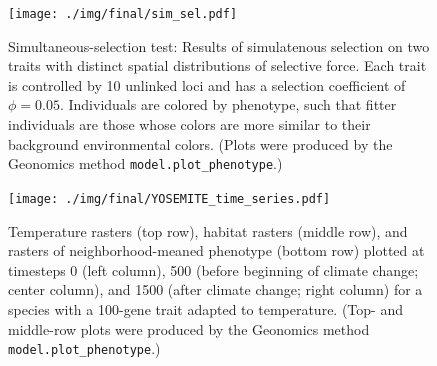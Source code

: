 ﻿\documentclass{article}
\begin{document}
        

\begin{figure}[H]
        \centering
        \texttt{[image: ./img/final/sim\_sel.pdf]}
        \caption{Simultaneous-selection test: Results of simulatenous selection
                 on two traits with distinct spatial distributions of selective force.
                 Each trait is controlled by 10 unlinked loci
                 and has a selection coefficient of $\phi = 0.05$.
                 Individuals are colored by phenotype, such that fitter individuals
                 are those whose colors are more similar to their background
                 environmental colors.  (Plots were produced by the
                 Geonomics method \texttt{model.plot\_phenotype}.)}
        \label{fig:sim_sel}
\end{figure}


\begin{figure}[H]
        \texttt{[image: ./img/final/YOSEMITE\_time\_series.pdf]}
        \caption{Temperature rasters (top row),
                 habitat rasters (middle row),
                 and rasters of neighborhood-meaned phenotype (bottom row)
                 plotted at timesteps 0 (left column),
                 500 (before beginning of climate change; center column),
                 and 1500 (after climate change; right column)
                 for a species with a 100-gene trait adapted to temperature.
                 (Top- and middle-row plots were produced
                 by the Geonomics method \texttt{model.plot\_phenotype}.)}
        \label{fig:yosemite}
\end{figure}
\end{document}
